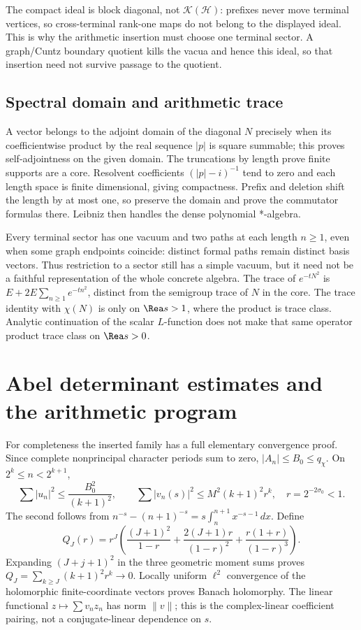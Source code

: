 \documentclass[11pt]{article}
\theoremstyle{definition}\newtheorem{definition}[theorem]{Definition}
\theoremstyle{remark}\newtheorem{remark}[theorem]{Remark}
\begin{document}
The compact ideal is block diagonal, not $\mathcal K(\mathcal H)$: prefixes never move terminal vertices, so cross-terminal rank-one maps do not belong to the displayed ideal. This is why the arithmetic insertion must choose one terminal sector. A graph/Cuntz boundary quotient kills the vacua and hence this ideal, so that insertion need not survive passage to the quotient.

\subsection{Spectral domain and arithmetic trace}
A vector belongs to the adjoint domain of the diagonal $N$ precisely when its coefficientwise product by the real sequence $|p|$ is square summable; this proves self-adjointness on the given domain. The truncations by length prove finite supports are a core. Resolvent coefficients $(|p|-i)^{-1}$ tend to zero and each length space is finite dimensional, giving compactness. Prefix and deletion shift the length by at most one, so preserve the domain and prove the commutator formulas there. Leibniz then handles the dense polynomial *-algebra.

Every terminal sector has one vacuum and two paths at each length $n\ge1$, even when some graph endpoints coincide: distinct formal paths remain distinct basis vectors. Thus restriction to a sector still has a simple vacuum, but it need not be a faithful representation of the whole concrete algebra. The trace of $e^{-tN^2}$ is $E+2E\sum_{n\ge1}e^{-tn^2}$, distinct from the semigroup trace of $N$ in the core. The trace identity with $\chi(N)$ is only on $\Rea s>1$, where the product is trace class. Analytic continuation of the scalar $L$-function does not make that same operator product trace class on $\Rea s>0$.

\section{Abel determinant estimates and the arithmetic program}
For completeness the inserted family has a full elementary convergence proof. Since complete nonprincipal character periods sum to zero, $|A_n|\le B_0\le q_\chi$. On $2^k\le n<2^{k+1}$,
\[
 \sum |u_n|^2\le\frac{B_0^2}{(k+1)^2},\qquad
 \sum |v_n(s)|^2\le M^2(k+1)^2r^k,\quad r=2^{-2\sigma_0}<1.
\]
The second follows from $n^{-s}-(n+1)^{-s}=s\int_n^{n+1}x^{-s-1}\,dx$. Define
\[
 Q_J(r)=r^J\left(\frac{(J+1)^2}{1-r}
 +\frac{2(J+1)r}{(1-r)^2}+\frac{r(1+r)}{(1-r)^3}\right).
\]
Expanding $(J+j+1)^2$ in the three geometric moment sums proves $Q_J=\sum_{k\ge J}(k+1)^2r^k\to0$. Locally uniform $\ell^2$ convergence of the holomorphic finite-coordinate vectors proves Banach holomorphy. The linear functional $z\mapsto\sum v_nz_n$ has norm $\|v\|$; this is the complex-linear coefficient pairing, not a conjugate-linear dependence on $s$.
\end{document}
